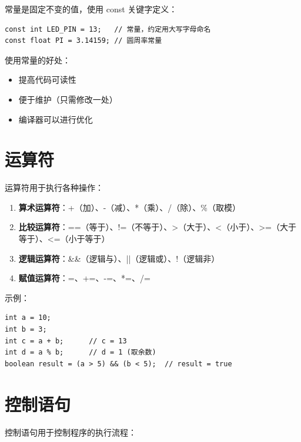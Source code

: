 \documentclass[12pt,UTF8]{ctexbook}
\begin{document}
常量是固定不变的值，使用 const 关键字定义：

\begin{lstlisting}
const int LED_PIN = 13;   // 常量，约定用大写字母命名
const float PI = 3.14159; // 圆周率常量
\end{lstlisting}

使用常量的好处：
\begin{itemize}
    \item 提高代码可读性
    \item 便于维护（只需修改一处）
    \item 编译器可以进行优化
\end{itemize}

\section{运算符}

运算符用于执行各种操作：

\begin{enumerate}
    \item \textbf{算术运算符}：+（加）、-（减）、*（乘）、/（除）、\%（取模）
    \item \textbf{比较运算符}：==（等于）、!=（不等于）、>（大于）、<（小于）、>=（大于等于）、<=（小于等于）
    \item \textbf{逻辑运算符}：&&（逻辑与）、||（逻辑或）、!（逻辑非）
    \item \textbf{赋值运算符}：=、+=、-=、*=、/=
\end{enumerate}

示例：
\begin{lstlisting}
int a = 10;
int b = 3;
int c = a + b;      // c = 13
int d = a % b;      // d = 1 (取余数)
boolean result = (a > 5) && (b < 5);  // result = true
\end{lstlisting}

\section{控制语句}

控制语句用于控制程序的执行流程：
\end{document}
